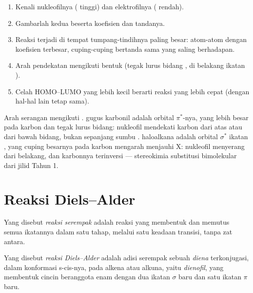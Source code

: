 \begin{method}\label{met:b2:frontier-orbitals:fmo}
\begin{enumerate}
  \item Kenali nukleofilnya ( tinggi) dan elektrofilnya ( rendah).
  \item Gambarlah kedua  beserta koefisien dan tandanya.
  \item Reaksi terjadi di tempat tumpang-tindihnya paling besar: atom-atom
        dengan koefisien terbesar, cuping-cuping bertanda sama yang saling
        berhadapan.
  \item Arah pendekatan mengikuti bentuk  (tegak lurus bidang
        , di belakang ikatan ).
  \item Celah HOMO--LUMO yang lebih kecil berarti reaksi yang lebih cepat
        (dengan hal-hal lain tetap sama).
\end{enumerate}
\end{method}

Arah serangan mengikuti .  gugus karbonil adalah orbital
$\pi^*$-nya, yang lebih besar pada karbon dan tegak lurus bidang: nukleofil
mendekati karbon dari atas atau dari bawah bidang, bukan sepanjang sumbu
.  haloalkana adalah orbital $\sigma^*$ ikatan , yang
cuping besarnya pada karbon mengarah menjauhi X: nukleofil menyerang dari
belakang, dan karbonnya terinversi --- stereokimia substitusi bimolekular
dari jilid Tahun 1.

\section{Reaksi Diels--Alder}

\begin{definition}\label{def:b2:frontier-orbitals:concerted}
Yang disebut \emph{reaksi serempak} adalah reaksi
yang membentuk dan memutus semua ikatannya dalam satu tahap, melalui satu
keadaan transisi, tanpa zat antara.
\end{definition}

\begin{definition}\label{def:b2:frontier-orbitals:diels-alder}
Yang disebut \emph{reaksi Diels--Alder} adalah
adisi serempak sebuah \emph{diena} terkonjugasi, dalam
konformasi s-cis-nya, pada alkena atau alkuna, yaitu
\emph{dienofil}, yang membentuk cincin beranggota enam
dengan dua ikatan $\sigma$ baru dan satu ikatan $\pi$ baru.
\end{definition}

